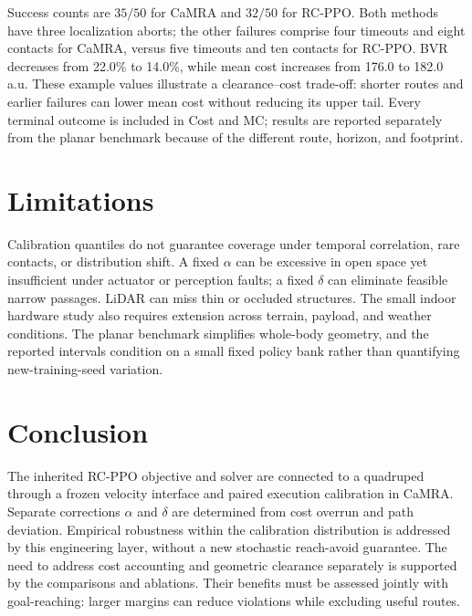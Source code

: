 \documentclass[conference]{IEEEtran}
\begin{document}
Success counts are $35/50$ for CaMRA and $32/50$ for RC-PPO. Both methods
have three localization aborts; the other failures comprise four timeouts and eight contacts
for CaMRA, versus five timeouts and ten contacts for RC-PPO. BVR decreases
from 22.0\% to 14.0\%, while mean cost increases from 176.0 to 182.0 a.u.
These example values illustrate a clearance--cost trade-off: shorter routes and
earlier failures can lower mean cost without reducing its upper tail.
Every terminal outcome is included in Cost and MC; results are reported separately
from the planar benchmark because of the different route, horizon, and footprint.

\FloatBarrier

\section{Limitations}
Calibration quantiles do not guarantee
coverage under temporal correlation, rare contacts, or distribution shift.
A fixed $\alpha$ can be excessive in open space yet insufficient under actuator
or perception faults; a fixed $\delta$ can eliminate feasible narrow passages.
LiDAR can miss thin or occluded structures. The small indoor hardware study also
requires extension across terrain, payload, and weather conditions. The planar
benchmark simplifies whole-body geometry, and the reported intervals condition
on a small fixed policy bank rather than quantifying new-training-seed variation.

\section{Conclusion}
The inherited RC-PPO objective and solver are connected to a quadruped through
a frozen velocity interface and paired execution calibration in CaMRA. Separate
corrections $\alpha$ and $\delta$ are determined from cost overrun and path
deviation. Empirical robustness within the calibration distribution is addressed
by this engineering layer, without a new stochastic reach-avoid guarantee. The
need to address cost accounting and geometric clearance separately is supported
by the comparisons and ablations. Their benefits must be assessed jointly with goal-reaching: larger
margins can reduce violations while excluding useful routes.




\clearpage
\appendices
\end{document}
